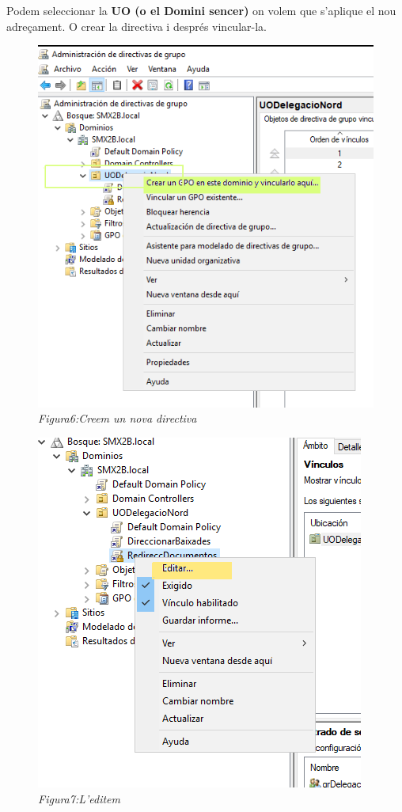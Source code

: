 \documentclass[
  a4paper,
]{article}
\begin{document}
Podem seleccionar la \textbf{UO (o el Domini sencer)} on volem que
s'aplique el nou adreçament. O crear la directiva i després vincular-la.

\begin{figure}
\centering
\includegraphics{png/CrearGPORedireccionar.png}
\caption{\emph{Figura6:Creem un nova directiva}}
\end{figure}

\begin{figure}
\centering
\includegraphics{png/EditarGPORedireccionar.png}
\caption{\emph{Figura7:L'editem}}
\end{figure}
\end{document}
